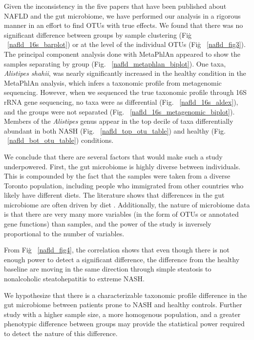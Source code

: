 Given the inconsistency in the five papers that have been published about NAFLD and the gut microbiome, we have performed our analysis in a rigorous manner in an effort to find OTUs with true effects. We found that there was no significant difference between groups by sample clustering (Fig\. ~\ref{nafld_16s_barplot}) or at the level of the individual OTUs (Fig\. ~\ref{nafld_fig3}). The principal component analysis done with MetaPhlAn appeared to show the samples separating by group (Fig. ~\ref{nafld_metaphlan_biplot}). One taxa, \textit{Alistipes shahii}, was nearly significantly increased in the healthy condition in the MetaPhlAn analysis, which infers a taxonomic profile from metagenomic sequencing. However, when we sequenced the true taxonomic profile through 16S rRNA gene sequencing, no taxa were as differential (Fig. ~\ref{nafld_16s_aldex}), and the groups were not separated (Fig. ~\ref{nafld_16s_metagenomic_biplot}). Members of the \textit{Alistipes} genus appear in the top decile of taxa differentially abundant in both NASH (Fig. ~\ref{nafld_top_otu_table}) and healthy (Fig. ~\ref{nafld_bot_otu_table}) conditions.

We conclude that there are several factors that would make such a study underpowered. First, the gut microbiome is highly diverse between individuals. This is compounded by the fact that the samples were taken from a diverse Toronto population, including people who immigrated from other countries who likely have different diets. The literature shows that differences in the gut microbiome are often driven by diet \cite{david2014diet}. Additionally, the nature of microbiome data is that there are very many more variables (in the form of OTUs or annotated gene functions) than samples, and the power of the study is inversely proportional to the number of variables.

From Fig\. ~\ref{nafld_fig4}, the correlation shows that even though there is not enough power to detect a significant difference, the difference from the healthy baseline are moving in the same direction through simple steatosis to nonalcoholic steatohepatitis to extreme NASH.

We hypothesize that there is a characterizable taxonomic profile difference in the gut microbiome between patients prone to NASH and healthy controls. Further study with a higher sample size, a more homogenous population, and a greater phenotypic difference between groups may provide the statistical power required to detect the nature of this difference.

